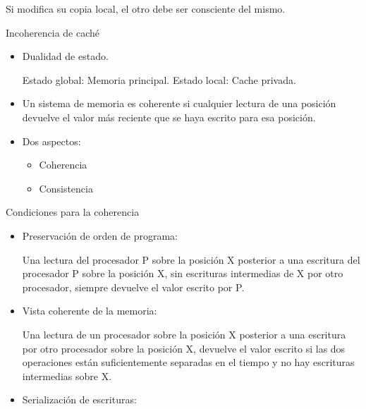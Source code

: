 \documentclass[12pt, twoside, openright]{report} %
\begin{document}
\begin{itemize}
\begin{itemize}
        
          Si modifica su copia local, el otro debe ser consciente del
          mismo.
      \end{itemize}

      Incoherencia de caché

      \begin{itemize}
      
      \item
        Dualidad de estado.

        
          Estado global: Memoria principal.
          Estado local: Cache privada.
      \item
        Un sistema de memoria es coherente si cualquier lectura de una
        posición devuelve el valor más reciente que se haya escrito
        para esa posición.
      \item
        Dos aspectos:
        \begin{itemize}
          \item Coherencia

          \item Consistencia
        \end{itemize}
        

      \end{itemize}

      Condiciones para la coherencia

      \begin{itemize}
      
      \item
        Preservación de orden de programa:

        Una lectura del procesador P sobre la posición X posterior a
          una escritura del procesador P sobre la posición X, sin
          escrituras intermedias de X por otro procesador, siempre
          devuelve el valor escrito por P.

          \item
        Vista coherente de la memoria:


        

        Una lectura de un procesador sobre la posición X posterior a
          una escritura por otro procesador sobre la posición X,
          devuelve el valor escrito si las dos operaciones están
          suficientemente separadas en el tiempo y no hay escrituras
          intermedias sobre X.

          \item
        Serialización de escrituras:



\end{itemize}
\end{itemize}
\end{document}
